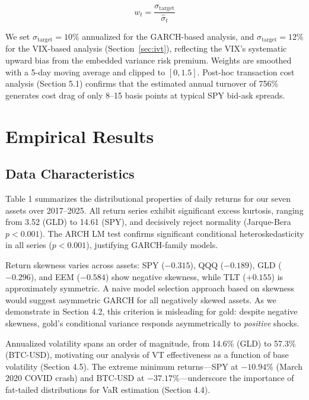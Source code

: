 \begin{equation}
w_t = \frac{\sigma_{\text{target}}}{\hat{\sigma}_t}
\end{equation}

We set $\sigma_{\text{target}} = 10\%$ annualized for the GARCH-based analysis, and $\sigma_{\text{target}} = 12\%$ for the VIX-based analysis (Section~\ref{sec:ivt}), reflecting the VIX's systematic upward bias from the embedded variance risk premium. Weights are smoothed with a 5-day moving average and clipped to $[0, 1.5]$. Post-hoc transaction cost analysis (Section 5.1) confirms that the estimated annual turnover of 756\% generates cost drag of only 8--15 basis points at typical SPY bid-ask spreads.



\section{Empirical Results}

\subsection{Data Characteristics}

Table 1 summarizes the distributional properties of daily returns for our seven assets over 2017--2025. All return series exhibit significant excess kurtosis, ranging from 3.52 (GLD) to 14.61 (SPY), and decisively reject normality (Jarque-Bera $p < 0.001$). The ARCH LM test confirms significant conditional heteroskedasticity in all series ($p < 0.001$), justifying GARCH-family models.

Return skewness varies across assets: SPY ($-0.315$), QQQ ($-0.189$), GLD ($-0.296$), and EEM ($-0.584$) show negative skewness, while TLT ($+0.155$) is approximately symmetric. A naive model selection approach based on skewness would suggest asymmetric GARCH for all negatively skewed assets. As we demonstrate in Section 4.2, this criterion is misleading for gold: despite negative skewness, gold's conditional variance responds asymmetrically to \textit{positive} shocks.

Annualized volatility spans an order of magnitude, from 14.6\% (GLD) to 57.3\% (BTC-USD), motivating our analysis of VT effectiveness as a function of base volatility (Section 4.5). The extreme minimum returns---SPY at $-10.94\%$ (March 2020 COVID crash) and BTC-USD at $-37.17\%$---underscore the importance of fat-tailed distributions for VaR estimation (Section 4.4).


